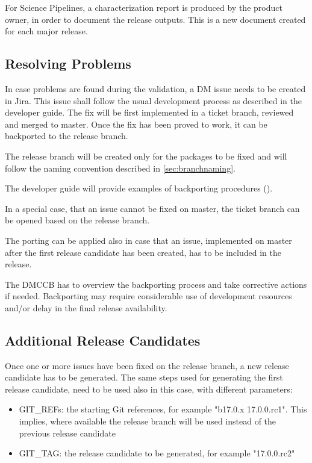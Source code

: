 For Science Pipelines, a characterization report is produced by the product owner, in order to document the release outputs.
This is a new document created for each major release.


\subsection{Resolving Problems}

In case problems are found during the validation, a DM issue needs to be created in Jira.
This issue shall follow the usual development process as described in the developer guide.
The fix will be first implemented in a ticket branch, reviewed and merged to master.
Once the fix has been proved to work, it can be backported to the release branch.

The release branch will be created only for the packages to be fixed and will follow the naming convention described in \ref{sec:branchnaming}.

The developer guide will provide examples of backporting procedures ().

In a special case, that an issue cannot be fixed on master, the ticket branch can be opened based on the release branch.

The porting can be applied also in case that an issue, implemented on master after the first release candidate has been created, has to be included in the release.

The DMCCB has to overview the backporting process and take corrective actions if needed. 
Backporting may require considerable use of development resources and/or delay in the final release availability.


\subsection{Additional Release Candidates} \label{sec:newrc}

Once one or more issues have been fixed on the release branch, a new release candidate has to be generated.
The same steps used for generating the first release candidate, need to be used also in this case, with different parameters:

\begin{itemize}
\item GIT\_REFs: the starting Git references, for example "b17.0.x 17.0.0.rc1". 
This implies, where available the release branch will be used instead of the previous release candidate
\item GIT\_TAG: the release candidate to be generated, for example "17.0.0.rc2"
\end{itemize}

